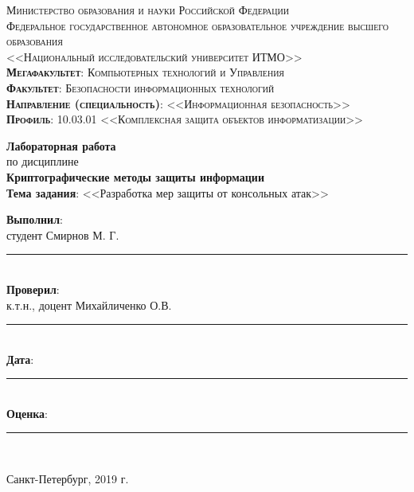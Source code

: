 \begin{titlepage}
	\begin{center}
		\textsc{
			\fontsize{12pt}{14pt}\selectfont
			Министерство образования и науки Российской Федерации\\
Федеральное государственное автономное образовательное учреждение высшего образования\\
<<Национальный исследовательский университет ИТМО>>\\
	\textbf{Мегафакультет}:  Компьютерных технологий и Управления\\
			\textbf{Факультет}: Безопасности информационных технологий\\
			\textbf{Направление (специальность)}: <<Информационная безопасность>>\\
			\textbf{Профиль}: 10.03.01 <<Комплексная защита объектов информатизации>>}
		
		\vfill
		
		\textbf{Лабораторная работа}\\
		по дисциплине\\
		\textbf{Криптографические методы защиты информации}\\
	\vfill
	\textbf{Тема задания}: <<Разработка мер защиты от консольных атак>>\\
	\end{center}

	\vfill
	
	\begin{flushright}
	\textbf{Выполнил}:\\ студент Смирнов М. Г. \rule{5em}{.1pt}\\
	\textbf{Проверил}:\\ к.т.н., доцент Михайличенко О.В.\rule{5em}{.1pt}\\
		\vfill
	\textbf{Дата}: \rule{10em}{.1pt}\\
	\textbf{Оценка}: \rule{10em}{.1pt}\\

	\vfill
	


	\end{flushright}
	\vfill
	\begin{center}
		Санкт-Петербург, 2019 г.
	\end{center}
\end{titlepage}